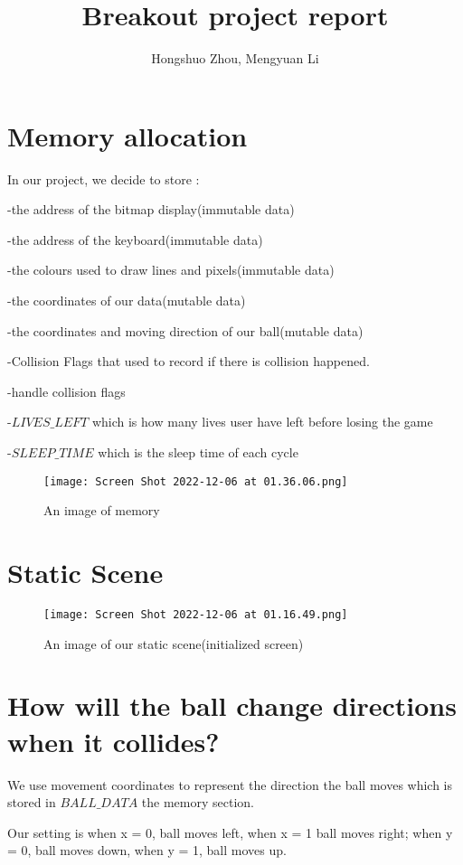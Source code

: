 \documentclass{article}
\title{Breakout project report}
\author{Hongshuo Zhou, Mengyuan Li}
\begin{document}
\maketitle

\section{Memory allocation}
In our project, we decide to store :


-the address of the bitmap display(immutable data)


-the address of the keyboard(immutable data)


-the colours used to draw lines and pixels(immutable data)


-the coordinates of our data(mutable data)


-the coordinates and moving direction of our ball(mutable data)

-Collision Flags that used to record if there is collision happened.

-handle collision flags

-$LIVES\_LEFT$ which is how many lives user have left before losing the game

-$SLEEP\_TIME$ which is the sleep time of each cycle

\begin{figure}[ht!]
    \centering
    \texttt{[image: Screen Shot 2022-12-06 at 01.36.06.png]}
    \caption{An image of memory}
    \label{f:part1}
\end{figure}


\section{Static Scene}
\begin{figure}[ht!]
    \centering
    \texttt{[image: Screen Shot 2022-12-06 at 01.16.49.png]}
    \caption{An image of our static scene(initialized screen)}
    \label{f:part1}
\end{figure}




\section{How will the ball change directions when it collides?}
We use movement coordinates to represent the direction the ball moves which is stored in $BALL\_DATA$ the memory section.

Our setting is when x = 0, ball moves left, when x = 1 ball moves right; when y = 0, ball moves down, when y = 1, ball moves up.
\end{document}
